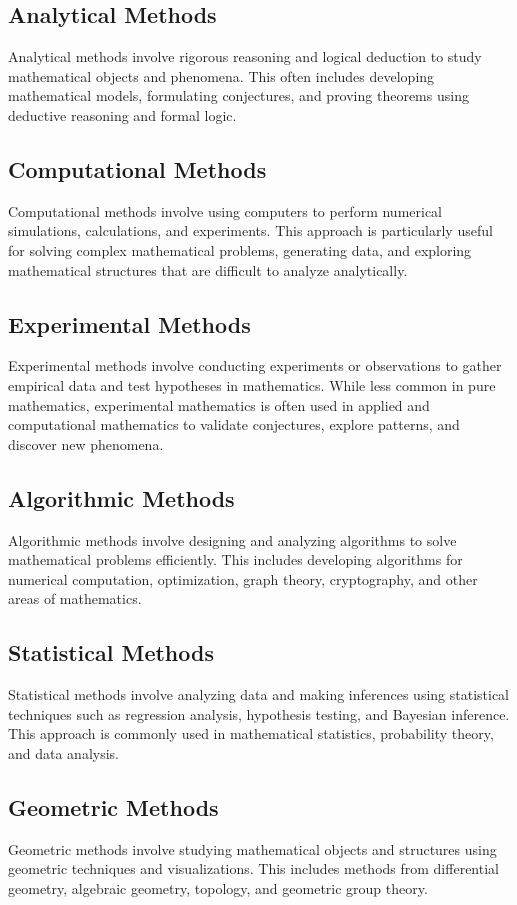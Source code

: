 \subsection{Analytical Methods}
Analytical methods involve rigorous reasoning and logical deduction to study mathematical objects and phenomena.
This often includes developing mathematical models, formulating conjectures, and proving theorems using deductive reasoning and formal logic.

\subsection{Computational Methods}
Computational methods involve using computers to perform numerical simulations, calculations, and experiments.
This approach is particularly useful for solving complex mathematical problems, generating data, and exploring mathematical structures that are difficult to analyze analytically.

\subsection{Experimental Methods}
Experimental methods involve conducting experiments or observations to gather empirical data and test hypotheses in mathematics.
While less common in pure mathematics, experimental mathematics is often used in applied and computational mathematics to validate conjectures, explore patterns, and discover new phenomena.

\subsection{Algorithmic Methods}
Algorithmic methods involve designing and analyzing algorithms to solve mathematical problems efficiently.
This includes developing algorithms for numerical computation, optimization, graph theory, cryptography, and other areas of mathematics.

\subsection{Statistical Methods}
Statistical methods involve analyzing data and making inferences using statistical techniques such as regression analysis, hypothesis testing, and Bayesian inference.
This approach is commonly used in mathematical statistics, probability theory, and data analysis.

\subsection{Geometric Methods}
Geometric methods involve studying mathematical objects and structures using geometric techniques and visualizations.
This includes methods from differential geometry, algebraic geometry, topology, and geometric group theory.

